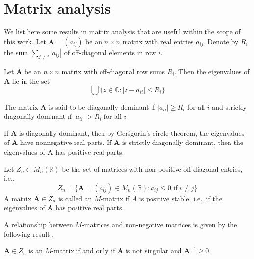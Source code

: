 \section{Matrix analysis}
\label{sec:matrix-analysis}
We list here some results in matrix analysis that are useful within
the scope of this work.
%
Let $\mathbf{A} = (a_{ij})$ be an $n \times n$ matrix with real
entries $a_{ij}$. Denote by $R_i$ the sum $\sum_{j \not = i}{|a_{ij}|}$ of
off-diagonal elements in row $i$. 
%
\begin{theorem}
  \label{thm:1}
  Let $\mathbf{A}$ be an $n \times n$ matrix with off-diagonal row
  sums $R_i$. Then the eigenvalues of $\mathbf{A}$ lie in the set
  \begin{equation}
    \label{eq:23}
    \bigcup \{z \in \mathbb{C} \colon |z - a_{ii}| \leq R_i \}
  \end{equation}
\end{theorem}
\begin{definition}
  \label{def:4}
  The matrix $\mathbf{A}$ is said to be diagonally dominant if
  $|a_{ii}| \geq R_i$ for all $i$ and strictly diagonally dominant if
  $|a_{ii}| > R_i$ for all $i$.
\end{definition}
If $\mathbf{A}$ is diagonally dominant, then by Ger\u{s}gorin's
circle theorem, the eigenvalues of $\mathbf{A}$ have nonnegative real
parts. If $\mathbf{A}$ is strictly diagonally dominant, then the
eigenvalues of $\mathbf{A}$ has positive real parts. 
%
\begin{definition}
  \label{def:8}
  Let $Z_n \subset M_{n}(\mathbb{R})$ be the set of matrices with
  non-positive off-diagonal entries, i.e.,
  \begin{equation}
    \label{eq:24}
    Z_n = \{ \mathbf{A} = (a_{ij}) \in M_{n}(\mathbb{R}) \colon a_{ij}
    \leq 0 \,\, \text{if $i \not = j$} \}
  \end{equation}
 A matrix $\mathbf{A} \in Z_n$ is called an $M$-matrix if $A$ is
 positive stable, i.e., if the eigenvalues of $\mathbf{A}$ has
 positive real parts.
\end{definition}
A relationship between $M$-matrices and non-negative matrices is given
by the following result \citep[\S 2.5]{horn94:_topic_in_matrix_analy}.
\begin{theorem}
  \label{thm:2}
  $\mathbf{A} \in Z_n$ is an $M$-matrix if and only if $\mathbf{A}$ is
  not singular and $\mathbf{A}^{-1} \geq 0$.  
\end{theorem}

